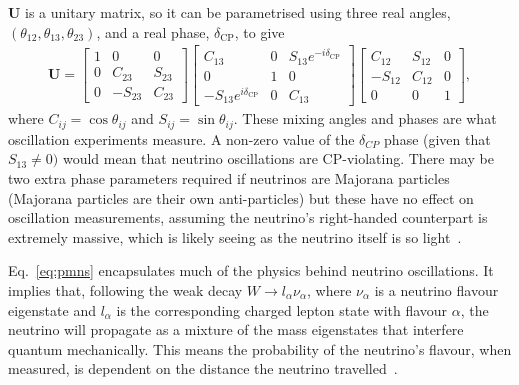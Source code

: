 \documentclass[aps,pra,12pt,notitlepage,tightenlines]{revtex4-1}
\newcommand\matr[1]{\bm{#1}}
\begin{document}
$\matr{U}$ is a unitary matrix, so it can be parametrised using three real angles, $(\theta_{12}, \theta_{13}, \theta_{23})$, and a real phase, $\delta_\mathrm{CP}$, to give
\begin{gather}
 \matr{U} = 
 \begin{bmatrix}
 1 & 0 & 0 \\
 0 & C_{23} & S_{23} \\
 0 & -S_{23} & C_{23}
 \end{bmatrix}
 \begin{bmatrix}
 C_{13} & 0 & S_{13}e^{-i\delta_\mathrm{CP}} \\
 0 & 1 & 0 \\
 -S_{13}e^{i\delta_\mathrm{CP}} & 0 & C_{13}
 \end{bmatrix}
 \begin{bmatrix}
 C_{12} & S_{12} & 0 \\
 -S_{12} & C_{12} & 0 \\
 0 & 0 & 1
 \end{bmatrix}
 ,
\end{gather}
where $C_{ij} = \cos\theta_{ij}$ and $S_{ij} = \sin\theta_{ij}$. These mixing angles and phases are what oscillation experiments measure. A non-zero value of the $\delta_{CP}$ phase (given that $S_{13}\neq 0)$ would mean that neutrino oscillations are CP-violating. There may be two extra phase parameters required if neutrinos are Majorana particles (Majorana particles are their own anti-particles) but these have no effect on oscillation measurements, assuming the neutrino's right-handed counterpart is extremely massive, which is likely seeing as the neutrino itself is so light~\cite{Kayser:2005cd}.

Eq.\ \eqref{eq:pmns} encapsulates much of the physics behind neutrino oscillations. It implies that, following the weak decay $W \rightarrow l_\alpha\nu_\alpha$, where $\nu_\alpha$ is a neutrino flavour eigenstate and $l_\alpha$ is the corresponding charged lepton state with flavour $\alpha$, the neutrino will propagate as a mixture of the mass eigenstates that interfere quantum mechanically. This means the probability of the neutrino's flavour, when measured, is dependent on the distance the neutrino travelled~\cite{Kayser:2005cd}. 
\end{document}
